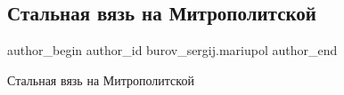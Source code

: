  
 
 
 
 

\subsection{Стальная вязь на Митрополитской}
\label{sec:22_07_2019.fb.burov_sergij.mariupol.1.stalnaya_vyaz_na_mit}

\ifcmt
 author_begin
   author_id burov_sergij.mariupol
 author_end
\fi

Стальная вязь на Митрополитской

